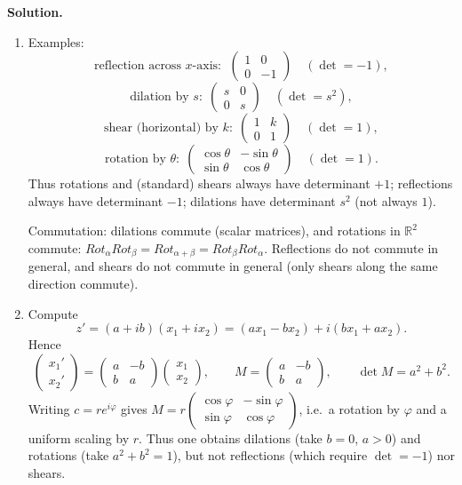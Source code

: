 \documentclass[12pt,a4paper]{article}
\theoremstyle{plain}
\theoremstyle{definition}      %
\begin{document}
\textbf{Solution.}
\begin{enumerate}[label=(\alph*)]
	\item Examples:
	\[
	\text{reflection across $x$-axis: }\;
	\begin{pmatrix}1&0\\0&-1\end{pmatrix}\quad(\det=-1),
	\]
	\[
	\text{dilation by }s:\;
	\begin{pmatrix}s&0\\0&s\end{pmatrix}\quad(\det=s^2),
	\]
	\[
	\text{shear (horizontal) by }k:\;
	\begin{pmatrix}1&k\\0&1\end{pmatrix}\quad(\det=1),
	\]
	\[
	\text{rotation by }\theta:\;
	\begin{pmatrix}\cos\theta&-\sin\theta\\ \sin\theta&\cos\theta\end{pmatrix}\quad(\det=1).
	\]
	Thus rotations and (standard) shears always have determinant $+1$; reflections always have determinant $-1$; dilations have determinant $s^2$ (not always $1$).
	
	Commutation: dilations commute (scalar matrices), and rotations in $\mathbb R^2$ commute:
	$Rot_\alpha Rot_\beta=Rot_{\alpha+\beta}=Rot_\beta Rot_\alpha$.
	Reflections do not commute in general, and shears do not commute in general (only shears along the same direction commute).
	\item Compute
	\[
	z'=(a+ib)(x_1+i x_2)=(ax_1-bx_2)+i(bx_1+ax_2).
	\]
	Hence
	\[
	\begin{pmatrix}x_1'\\x_2'\end{pmatrix}
	=
	\begin{pmatrix}a&-b\\ b&a\end{pmatrix}
	\begin{pmatrix}x_1\\x_2\end{pmatrix},
	\qquad
	M=\begin{pmatrix}a&-b\\ b&a\end{pmatrix},
	\qquad
	\det M=a^2+b^2.
	\]
	Writing $c=re^{i\varphi}$ gives
	$M=r\begin{pmatrix}\cos\varphi&-\sin\varphi\\ \sin\varphi&\cos\varphi\end{pmatrix}$,
	i.e.\ a rotation by $\varphi$ and a uniform scaling by $r$.
	Thus one obtains dilations (take $b=0$, $a>0$) and rotations (take $a^2+b^2=1$), but not reflections (which require $\det=-1$) nor shears.
\end{enumerate}
\end{document}
